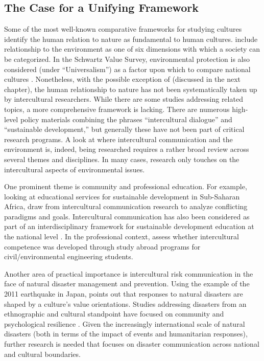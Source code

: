 \subsection{The Case for a Unifying Framework}

Some of the most well-known comparative frameworks for studying cultures identify the human relation to nature as fundamental to human cultures. \cite{Kluckhohn1961} include relationship to the environment as one of six dimensions with which a society can be categorized. In the Schwartz Value Survey, environmental protection is also considered (under ``Universalism'') as a factor upon which to compare national cultures \citep{Sagiv2000}. Nonetheless, with the possible exception of \cite*{Mendoza2016a} (discussed in the next chapter), the human relationship to nature has not been systematically taken up by intercultural researchers. While there are some studies addressing related topics, a more comprehensive framework is lacking. There are numerous high-level policy materials combining the phrases ``intercultural dialogue'' and ``sustainable development,'' but generally these have not been part of critical research programs. A look at where intercultural communication and the environment is, indeed, being researched requires a rather broad review across several themes and disciplines. In many cases, research only touches on the intercultural aspects of environmental issues.

One prominent theme is community and professional education. For example, looking at educational services for sustainable development in Sub-Saharan Africa, \cite*{Evani2016a} draw from intercultural communication research to analyze conflicting paradigms and goals. Intercultural communication has also been considered as part of an interdisciplinary framework for sustainable development education at the national level \citep{Volodymyr2017a}. In the professional context, \cite*{Merfeld2017a} assess whether intercultural competence was developed through study abroad programs for civil/environmental engineering students.

Another area of practical importance is intercultural risk communication in the face of natural disaster management and prevention. Using the example of the 2011 earthquake in Japan, \cite*{Neuliep2017a} points out that responses to natural disasters are shaped by a culture's value orientations. Studies addressing disasters from an ethnographic and cultural standpoint have focused on community and psychological resilience \citep[e.g.][]{Marsella2004a}. Given the increasingly international scale of natural disasters (both in terms of the impact of events and humanitarian responses), further research is needed that focuses on disaster communication across national and cultural boundaries.

